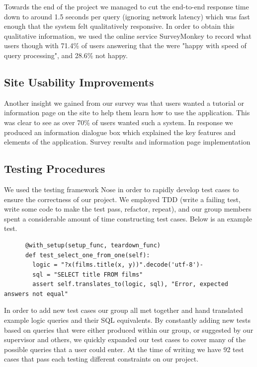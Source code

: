 \documentclass[a4paper, 11pt]{article}
\begin{document}
    Towards the  end of the project we managed to cut the end-to-end response time 
    down to  around 1.5 seconds per query (ignoring network latency) which was 
    fast enough that the system felt qualitatively responsive. In order to obtain 
    this qualitative information, we used the online service SurveyMonkey to record 
    what users though with 71.4\% of users answering that the were "happy with speed
    of query processing", and 28.6\% not happy. 

    \subsection{Site Usability Improvements}
    Another insight we gained from our survey was that users wanted a tutorial
    or information page on the site to help them learn how to use the
    application. This was clear to see as over 70\% of users wanted such a
    system. In response we produced an information dialogue box which explained
    the key features and elements of the application.
    Survey results and information page implementation   
    \subsection{Testing Procedures}
    We used the testing framework Nose in order to rapidly develop test cases to
    ensure the correctness of our project. We employed TDD (write a failing
    test, write some code to make the test pass, refactor, repeat), and our group 
    members spent a considerable amount of time constructing test cases. Below is an 
    example test.
  
    \begin{verbatim}
      @with_setup(setup_func, teardown_func)
      def test_select_one_from_one(self):
        logic = "?x(films.title(x, y))".decode('utf-8')-
        sql = "SELECT title FROM films"
        assert self.translates_to(logic, sql), "Error, expected answers not equal"
    \end{verbatim}

    In order to add new test cases our group all met together and hand translated 
    example logic queries and their SQL equivalents. By constantly adding new tests 
    based on queries that were either produced within our group, or suggested by our 
    supervisor and others, we quickly expanded our test cases to cover many of the 
    possible queries that a user could enter. At the time of writing we have 92 test 
    cases that pass each testing different constraints on our project.
\end{document}
